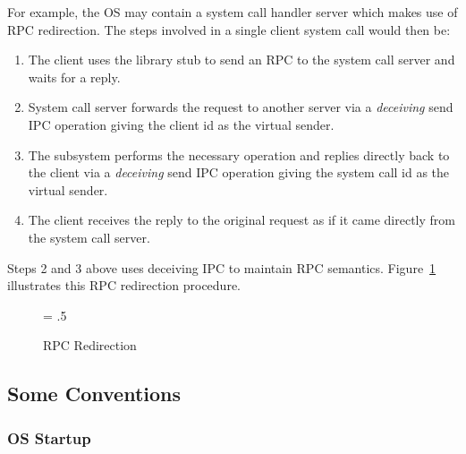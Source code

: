 For example, the OS may contain a system call handler server which
makes use of RPC redirection.  The steps involved in a single client
system call would then be:

\begin{enumerate}

\item The client uses the library stub to send an RPC to the system
  call server and waits for a reply.

\item System call server forwards the request to another server via a
  \emph{deceiving} send IPC operation giving the client id as the
  virtual sender.

\item The subsystem performs the necessary operation and replies
  directly back to the client via a \emph{deceiving} send IPC
  operation giving the system call id as the virtual sender.

\item The client receives the reply to the original request as if it
  came directly from the system call server.

\end{enumerate}

Steps 2 and 3 above uses deceiving IPC to maintain RPC semantics.
Figure~\ref{fig:l4-redir} illustrates this RPC redirection procedure.
\\ 

\begin{figure}[h]
\begin{center}
\leavevmode
\epsfxsize = .5\textwidth
{}
\end{center}
\caption{RPC Redirection}
\label{fig:l4-redir}
\end{figure}


\subsection{Some Conventions}



\subsubsection{OS Startup}

